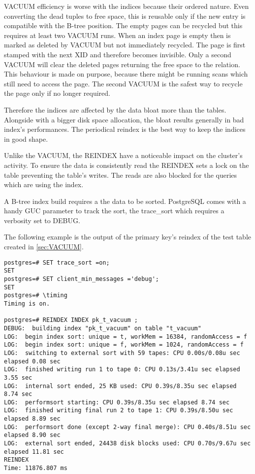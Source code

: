 VACUUM efficiency is worse with the indices because their ordered nature. Even converting the dead
tuples to free space, this is reusable only if the new entry is compatible with the B-tree position.
The empty pages can be recycled but this requires at least two VACUUM runs. When an index page is empty
then is marked as deleted by VACUUM but not immediately recycled. The page is first stamped with the next
XID and therefore becomes invisible. Only a second VACUUM will clear the deleted pages returning the
free space to the relation. This behaviour is made on purpose, because there might be running
scans which still need to access the page. The second VACUUM is the safest way to recycle the page only
if no longer required.\newline

Therefore the indices are affected by the data bloat more than the tables. Alongside with a bigger disk
space allocation, the bloat results generally in bad index's performances. The periodical reindex
is the best way to keep the indices in good shape.\newline

Unlike the VACUUM, the REINDEX have a noticeable impact on the cluster's activity. To ensure the data is
consistently read the REINDEX sets a lock on the table preventing the table's writes. The reads are also
blocked for the queries which are using the index.\newline

A B-tree index build requires a the data to be sorted. PostgreSQL comes with a handy GUC parameter to track
the sort, the trace\_sort which requires a verbosity set to DEBUG.

The following example is the output of the primary key's reindex of the test table created in
\ref{sec:VACUUM}.


\begin{lstlisting}[style=pgsql]
postgres=# SET trace_sort =on;
SET
postgres=# SET client_min_messages ='debug';
SET
postgres=# \timing
Timing is on.

postgres=# REINDEX INDEX pk_t_vacuum ;
DEBUG:  building index "pk_t_vacuum" on table "t_vacuum"
LOG:  begin index sort: unique = t, workMem = 16384, randomAccess = f
LOG:  begin index sort: unique = f, workMem = 1024, randomAccess = f
LOG:  switching to external sort with 59 tapes: CPU 0.00s/0.08u sec elapsed 0.08 sec
LOG:  finished writing run 1 to tape 0: CPU 0.13s/3.41u sec elapsed 3.55 sec
LOG:  internal sort ended, 25 KB used: CPU 0.39s/8.35u sec elapsed 8.74 sec
LOG:  performsort starting: CPU 0.39s/8.35u sec elapsed 8.74 sec
LOG:  finished writing final run 2 to tape 1: CPU 0.39s/8.50u sec elapsed 8.89 sec
LOG:  performsort done (except 2-way final merge): CPU 0.40s/8.51u sec elapsed 8.90 sec
LOG:  external sort ended, 24438 disk blocks used: CPU 0.70s/9.67u sec elapsed 11.81 sec
REINDEX
Time: 11876.807 ms

\end{lstlisting}

